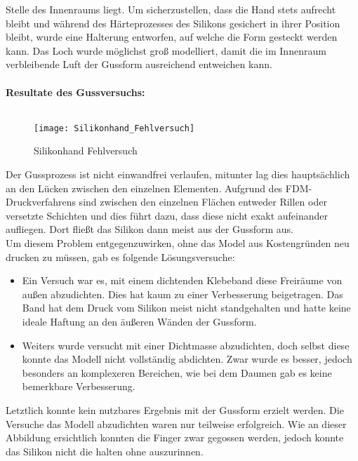\documentclass[titlepage,12pt,twoside]{article}
\begin{document}
Stelle des Innenraums liegt. Um sicherzustellen, dass die Hand stets aufrecht bleibt und während des Härteprozesses des Silikons gesichert in ihrer Position bleibt, wurde eine Halterung entworfen, auf welche die Form gesteckt werden kann. Das Loch 
wurde möglichst groß modelliert, damit die im Innenraum verbleibende Luft der Gussform ausreichend entweichen kann. \\
\\
\textbf{Resultate des Gussversuchs:} \\
\\
\begin{figure}[H]
	\begin{center}
		\scalebox{0.8}
		{\texttt{[image: Silikonhand\_Fehlversuch]}}
		\caption{Silikonhand Fehlversuch}
		\label{fig:Silikonhand_Fehlversuch}			
	\end{center}
\end{figure}
\hfill \break
Der Gussprozess ist nicht einwandfrei verlaufen, mitunter lag dies hauptsächlich an den Lücken zwischen den einzelnen Elementen. Aufgrund des FDM-Druckverfahrens sind zwischen den einzelnen Flächen entweder Rillen oder versetzte Schichten und dies 
führt dazu, dass diese nicht exakt aufeinander aufliegen. Dort fließt das Silikon dann meist aus der Gussform aus. \\
Um diesem Problem entgegenzuwirken, ohne das Model aus Kostengründen neu drucken zu müssen, gab es folgende Lösungsversuche:
\begin{itemize}
	\item Ein Versuch war es, mit einem dichtenden Klebeband diese Freiräume von außen abzudichten. Dies hat kaum zu einer Verbesserung beigetragen. Das Band hat dem Druck vom Silikon meist nicht standgehalten und hatte keine ideale Haftung an 
	den äußeren Wänden der Gussform.
	\item Weiters wurde versucht mit einer Dichtmasse abzudichten, doch selbst diese konnte das Modell nicht vollständig abdichten. Zwar wurde es besser, jedoch besonders an komplexeren Bereichen, wie bei dem Daumen gab es keine bemerkbare Verbesserung.
\end{itemize}
\hfill \break
Letztlich konnte kein nutzbares Ergebnis mit der Gussform erzielt werden. Die Versuche das Modell abzudichten waren nur teilweise erfolgreich. Wie an dieser Abbildung ersichtlich konnten die Finger zwar gegossen werden, jedoch konnte das Silikon 
nicht die  halten ohne auszurinnen. \\
\\
\end{document}
